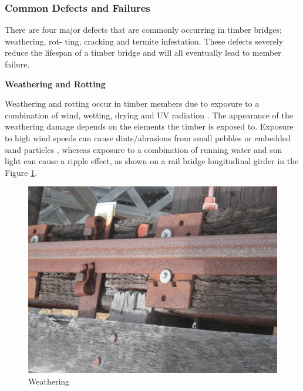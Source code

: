 \documentclass[11pt,a4paper]{article}
\numberwithin{equation}{subsection}
\begin{document}
	\subsubsection{Common Defects and Failures}
    There are four major defects that are commonly occurring in timber bridges; weathering, rot- ting, cracking and termite infestation. These defects severely reduce the lifespan of a timber bridge and will all eventually lead to member failure.

    \vspace*{\baselineskip}
    
    \noindent
    \textbf{Weathering and Rotting}

	\noindent
	Weathering and rotting occur in timber members due to exposure to a combination of wind, wetting, drying and UV radiation \cite{_timber_2005,_section_2008}. The appearance of the weathering damage depends on the elements the timber is exposed to. Exposure to high wind speeds can cause dints/abrasions from small pebbles or embedded sand particles \cite{harrowfield_analysis_2006}, whereas exposure to a combination of running water and sun light can cause a ripple effect, as shown on a rail bridge longitudinal girder in the Figure \ref{fig:Weather}.
	
\begin{figure}[h]
	\begin{center}
		\includegraphics[scale=0.07]{Weathering}
	\end{center}
	\caption{Weathering}
	\label{fig:Weather}
\end{figure}
	\pagebreak
	
\end{document}

